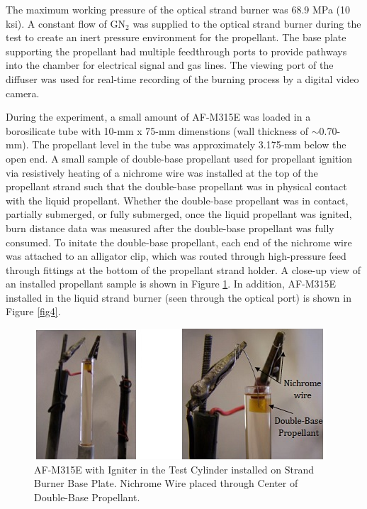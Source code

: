 \documentclass{article}
\begin{document}
The maximum working pressure of the optical strand burner was 68.9 MPa (10 ksi). A constant flow of GN$_2$ was
supplied to the optical strand burner during the test to create an inert pressure environment for the propellant.
The base plate supporting the propellant had multiple feedthrough ports to provide pathways into the chamber for
electrical signal and gas lines. The viewing port of the diffuser was used for real-time recording of the burning
process by a digital video camera.

During the experiment, a small amount of AF-M315E was loaded in a borosilicate tube with 10-mm x 75-mm dimenstions
(wall thickness of $\sim$0.70-mm). The propellant level in the tube was approximately 3.175-mm below the open end.
A small sample of double-base propellant used for propellant ignition via resistively heating of a nichrome wire
was installed at the top of the propellant strand such that the double-base propellant was in physical contact with
the liquid propellant. Whether the double-base propellant was in contact, partially submerged, or fully submerged,
once the liquid propellant was ignited, burn distance data was measured after the double-base propellant was fully
consumed. To initate the double-base propellant, each end of the nichrome wire was attached to an alligator clip, 
which was routed through high-pressure feed through fittings at the bottom of the propellant strand holder. A
close-up view of an installed propellant sample is shown in Figure \ref{fig3}. In addition, AF-M315E installed in
the liquid strand burner (seen through the optical port) is shown in Figure \ref{fig4}.

\begin{figure}[htb!]
\centering
\includegraphics[width=0.25\textheight]{Figure_3.jpg}
\caption{AF-M315E with Igniter in the Test Cylinder installed on Strand Burner Base Plate. Nichrome Wire placed through Center of Double-Base Propellant.}
\label{fig3}
\end{figure}
\end{document}
